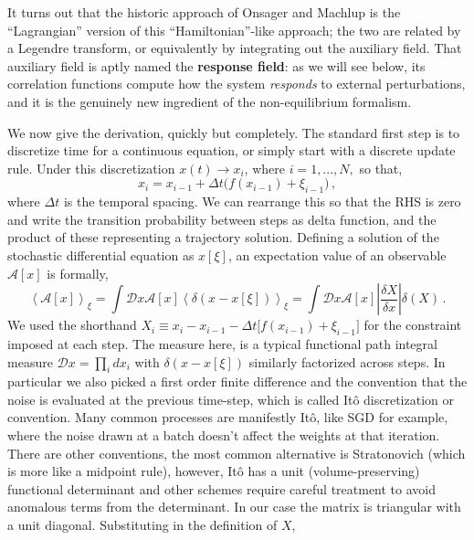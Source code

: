 \documentclass[11pt]{article}
\newcommand{\expval}[1]{\left\langle #1 \right\rangle}
\newcommand{\abs}[1]{\left| #1 \right|}
\begin{document}
It turns out that the historic approach of Onsager and Machlup \cite{onsager_machlup_1953} is the ``Lagrangian'' version of this ``Hamiltonian''-like approach; the two are related by a Legendre transform, or equivalently by integrating out the auxiliary field. That auxiliary field is aptly named the \textbf{response field}: as we will see below, its correlation functions compute how the system \emph{responds} to external perturbations, and it is the genuinely new ingredient of the non-equilibrium formalism.

We now give the derivation, quickly but completely.  The standard first step is to discretize time for a continuous equation, or simply start with a discrete update rule.  Under this discretization $x(t) \to x_i$, where $i = 1, ..., N,$ so that,
\begin{equation}
    x_i = x_{i-1} + \Delta t \Big(f(x_{i-1}) + \xi_{i-1}\Big)\,,
\end{equation} 
where $\Delta t$ is the temporal spacing. We can rearrange this so that the RHS is zero and write the transition probability between steps as delta function, and the product of these representing a trajectory solution.  Defining a solution of the stochastic differential equation as $x[\xi]$, an expectation value of an observable $\mathcal{A}[x]$ is formally,
\begin{equation}
    \expval{\mathcal{A} [x]}_{\xi} = \int \mathcal{D}x \mathcal{A}[x] \expval{\delta(x- x[\xi])}_\xi
 = \int \mathcal{D} x \mathcal{A}[x] \abs{\frac{\delta X}{\delta x}} \delta(X)\,.
 \end{equation}
We used the shorthand $X_i \equiv  x_i - x_{i-1} - \Delta t \big[ f(x_{i-1}) + \xi_{i-1}\big]$ for the constraint imposed at each step. The measure here, is a typical functional path integral measure $\mathcal{D}x = \prod_i d x_i$ with $\delta(x- x[\xi])$ similarly factorized across steps.  In particular we also picked a first order finite difference and the convention that the noise is evaluated at the previous time-step, which is called It\^{o} discretization or convention.  Many common processes are manifestly It\^{o}, like SGD for example, where the noise drawn at a batch doesn't affect the weights at that iteration. There are other conventions, the most common alternative is Stratonovich (which is more like a midpoint rule), however, It\^{o} has a unit (volume-preserving) functional determinant and other schemes require careful treatment to avoid anomalous terms from the determinant.  In our case the matrix is triangular with a unit diagonal.  Substituting in the definition of $X$,
\end{document}
